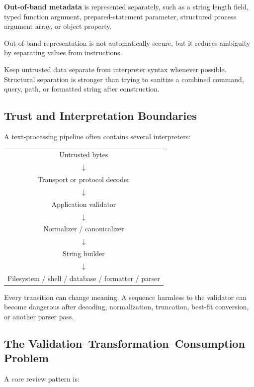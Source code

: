 \documentclass[11pt]{article}
\newcommand{\term}[1]{\textbf{#1}}
\begin{document}
\term{Out-of-band metadata} is represented separately, such as a string length field, typed function argument, prepared-statement parameter, structured process argument array, or object property.

Out-of-band representation is not automatically secure, but it reduces ambiguity by separating values from instructions.

\begin{securityprinciple}
Keep untrusted data separate from interpreter syntax whenever possible. Structural separation is stronger than trying to sanitize a combined command, query, path, or formatted string after construction.
\end{securityprinciple}

\subsection{Trust and Interpretation Boundaries}

A text-processing pipeline often contains several interpreters:

\begin{center}
\begin{tabular}{c}
Untrusted bytes \\
\(\downarrow\) \\
Transport or protocol decoder \\
\(\downarrow\) \\
Application validator \\
\(\downarrow\) \\
Normalizer / canonicalizer \\
\(\downarrow\) \\
String builder \\
\(\downarrow\) \\
Filesystem / shell / database / formatter / parser
\end{tabular}
\end{center}

Every transition can change meaning. A sequence harmless to the validator can become dangerous after decoding, normalization, truncation, best-fit conversion, or another parser pass.
\clearpage

\subsection{The Validation--Transformation--Consumption Problem}

A core review pattern is:
\end{document}
